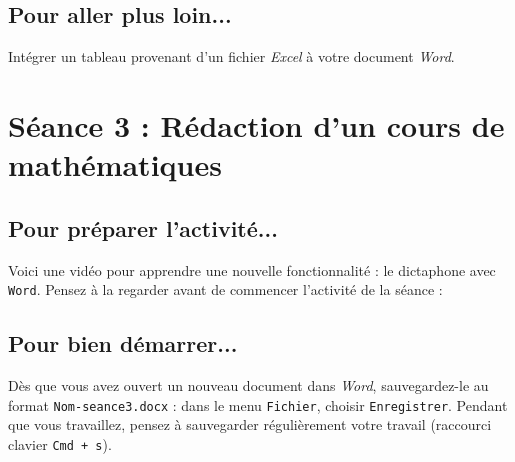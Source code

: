 \subsection{Pour aller plus loin...}

Intégrer un tableau provenant d'un fichier \emph{Excel} à votre document \emph{Word}.

\vfill




%
%
%
%




\pagebreak

\section{Séance 3 : Rédaction d'un cours de mathématiques}\label{ficheTexte4e1}

\subsection{Pour préparer l'activité...}

\vspace{10pt}

Voici une vidéo pour apprendre une nouvelle fonctionnalité : le dictaphone avec \texttt{Word}. Pensez à la regarder avant de commencer l'activité de la séance :

\begin{center}
\end{center}

\vspace{12pt}

\subsection{Pour bien démarrer...}

Dès que vous avez ouvert un nouveau document dans \emph{Word}, sauvegardez-le au format \texttt{Nom-seance3.docx} : dans le menu \texttt{Fichier}, choisir \texttt{Enregistrer}. Pendant que vous travaillez, pensez à sauvegarder régulièrement votre travail (raccourci clavier \texttt{Cmd + s}).   


